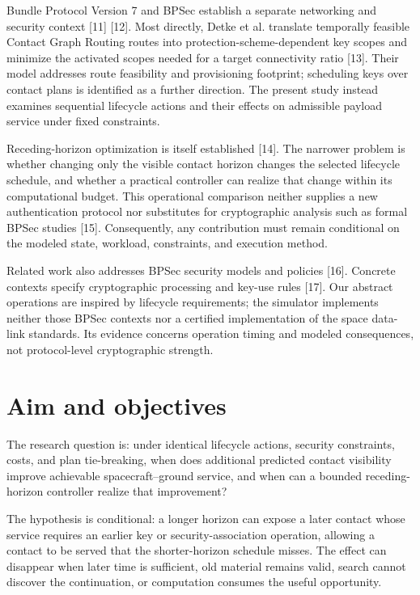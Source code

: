 \documentclass[12pt,a4paper]{article}
\begin{document}
Bundle Protocol Version 7 and BPSec establish a separate networking and security context [11] [12]. Most directly, Detke et al. translate temporally feasible Contact Graph Routing routes into protection-scheme-dependent key scopes and minimize the activated scopes needed for a target connectivity ratio [13]. Their model addresses route feasibility and provisioning footprint; scheduling keys over contact plans is identified as a further direction. The present study instead examines sequential lifecycle actions and their effects on admissible payload service under fixed constraints.

Receding-horizon optimization is itself established [14]. The narrower problem is whether changing only the visible contact horizon changes the selected lifecycle schedule, and whether a practical controller can realize that change within its computational budget. This operational comparison neither supplies a new authentication protocol nor substitutes for cryptographic analysis such as formal BPSec studies [15]. Consequently, any contribution must remain conditional on the modeled state, workload, constraints, and execution method.

Related work also addresses BPSec security models and policies [16]. Concrete contexts specify cryptographic processing and key-use rules [17]. Our abstract operations are inspired by lifecycle requirements; the simulator implements neither those BPSec contexts nor a certified implementation of the space data-link standards. Its evidence concerns operation timing and modeled consequences, not protocol-level cryptographic strength.

\section*{Aim and objectives}
The research question is: under identical lifecycle actions, security constraints, costs, and plan tie-breaking, when does additional predicted contact visibility improve achievable spacecraft--ground service, and when can a bounded receding-horizon controller realize that improvement?

The hypothesis is conditional: a longer horizon can expose a later contact whose service requires an earlier key or security-association operation, allowing a contact to be served that the shorter-horizon schedule misses. The effect can disappear when later time is sufficient, old material remains valid, search cannot discover the continuation, or computation consumes the useful opportunity.
\end{document}
